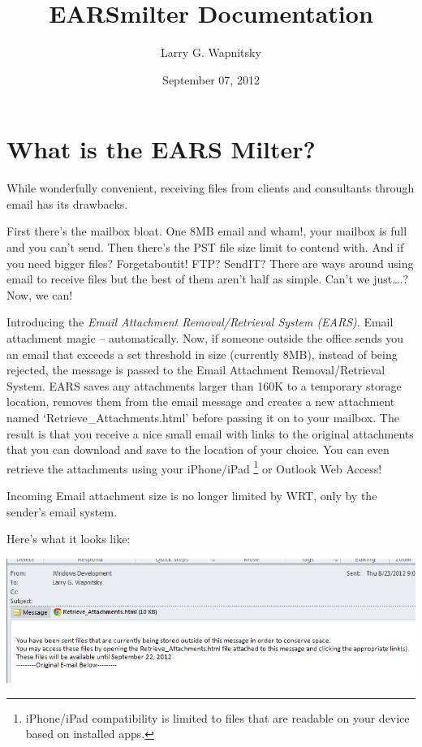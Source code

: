 \documentclass[letterpaper,10pt,english]{sphinxmanual}
\title{EARSmilter Documentation}
\date{September 07, 2012}
\author{Larry G. Wapnitsky}
\begin{document}
\maketitle
\tableofcontents
{}\label{index::doc}



\chapter{What is the EARS Milter?}
\label{about:wrt-e-mail-attachment-removal-retrieval-system-ears-milter}\label{about::doc}\label{about:what-is-the-ears-milter}
While wonderfully convenient, receiving files from clients and consultants through email has its drawbacks.

First there’s the mailbox bloat. One 8MB email and wham!, your mailbox is full and you can’t send.
Then there’s the PST file size limit to contend with.
And if you need bigger files? Forgetaboutit!
FTP? SendIT? There are ways around using email to receive files but the best of them aren’t half as simple.
Can’t we just….? Now, we can!

Introducing the \emph{Email Attachment Removal/Retrieval System (EARS)}. Email
attachment magic – automatically. Now, if someone outside the office sends you
an email that exceeds a set threshold in size (currently 8MB), instead of being
rejected, the message is passed to the Email Attachment Removal/Retrieval
System. EARS saves any attachments larger than 160K to a temporary storage
location, removes them from the email message and creates a new attachment
named ‘Retrieve\_Attachments.html’ before passing it on to your mailbox. The
result is that you receive a nice small email with links to the original
attachments that you can download and save to the location of your choice. You
can even retrieve the attachments using your iPhone/iPad \footnote{
iPhone/iPad compatibility is limited to files that are readable on your device based on installed apps.
} or Outlook Web
Access!

Incoming Email attachment size is no longer limited by WRT, only by the sender’s email system.

Here’s what it looks like:

\includegraphics{EARSmilter.png}
\end{document}
